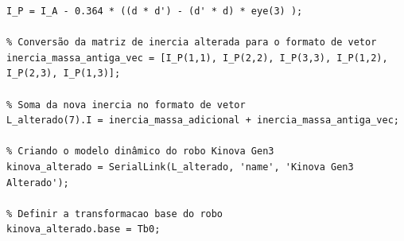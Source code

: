 \documentclass[10pt]{article}
\begin{document}
\begin{lstlisting}[caption={Código principal do trabalho}, label={code:codigo}]
% Matriz de inercia no novo ponto (teorema dos eixos paralelos)
I_P = I_A - 0.364 * ((d * d') - (d' * d) * eye(3) );

% Conversão da matriz de inercia alterada para o formato de vetor
inercia_massa_antiga_vec = [I_P(1,1), I_P(2,2), I_P(3,3), I_P(1,2), I_P(2,3), I_P(1,3)];

% Soma da nova inercia no formato de vetor
L_alterado(7).I = inercia_massa_adicional + inercia_massa_antiga_vec;

% Criando o modelo dinâmico do robo Kinova Gen3
kinova_alterado = SerialLink(L_alterado, 'name', 'Kinova Gen3 Alterado');

% Definir a transformacao base do robo
kinova_alterado.base = Tb0;
\end{lstlisting}
\end{document}
